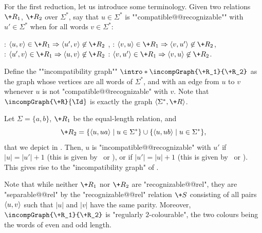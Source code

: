 \AP For the first reduction, let us introduce some terminology.
Given two relations $\+R_1$, $\+R_2$ over $\Sigma^*$, say that
$u \in \Sigma^*$ is ""compatible@@recognizable"" with
$u' \in \Sigma^*$ when for all words $v \in \Sigma^*$:
\begin{center}
    \intro*\compL: $\tup{u,v} \in \+R_1 \Rightarrow \tup{u',v} \not\in \+R_2$%
    ,\hphantom{\text{ \fancyand }}
    \intro*\compR: $\tup{v,u} \in \+R_1 \Rightarrow \tup{v,u'} \not\in \+R_2$,\\
    \intro*\compLpr: $\tup{u',v} \in \+R_1 \Rightarrow \tup{u,v} \not\in \+R_2$%
    \hphantom{,}\text{ \fancyand }
    \intro*\compRpr: $\tup{v,u'} \in \+R_1 \Rightarrow \tup{v,u} \not\in \+R_2$.
\end{center}
\AP
Define the ""incompatibility graph"" $\intro*\incompGraph{\+R_1}{\+R_2}$
as the graph whose vertices are all words of $\Sigma^*$,
and with an edge from $u$ to $v$ whenever $u$ is not "compatible@@recognizable" with $v$.
Note that $\incompGraph{\+R}{\Id}$ is exactly the graph $\tup{\Sigma^*,\+R}$.

\begin{example}%
    \AP\label{ex:equal-length-plusone}%
    Let $\Sigma = \{a,b\}$, $\+R_1$ be the equal-length relation,
    and
    \[
        \+R_2 = \{\tup{u, ua} \mid u \in \Sigma^*\} \cup \{\tup{u, ub} \mid u \in \Sigma^*\},
    \]
    that we depict in .
    Then, $u$ is "incompatible@@recognizable" with $u'$ if $|u| = |u'|+1$ (this is given by \compL~or \compR),
    or if $|u'| = |u|+1$ (this is given by \compLpr~or \compRpr).
    This gives rise to the "incompatibility graph" of
    .
    \begin{marginfigure}[-8em]%
        \centering
        \begin{tikzpicture}
            
        \end{tikzpicture}
        \caption{\AP\label{fig:equal-length-plusone-relation}%
            The relation $\+R_2$ of ,
            restricted to words of length at most 2.
        }
    \end{marginfigure}%
    \begin{marginfigure}%
        \centering
        \begin{tikzpicture}
            
        \end{tikzpicture}
        \caption{\AP\label{fig:equal-length-plusone-incompatibility}%
            "Incompatibility graph" $\incompGraph{\+R_1}{\+R_2}$ and its "regular $2$-colouring".%
        }
    \end{marginfigure}%

    Note that while neither $\+R_1$ nor $\+R_2$ are "recognizable@@rel",
    they are "separable@@rel" by the "recognizable@@rel" relation
    $\+S$ consisting of all pairs $\langle u,v\rangle$ such that $|u|$ and $|v|$ have the same parity.
    Moreover, $\incompGraph{\+R_1}{\+R_2}$ is "regularly $2$-colourable", the two colours being
    the words of even and odd length.
\end{example}

